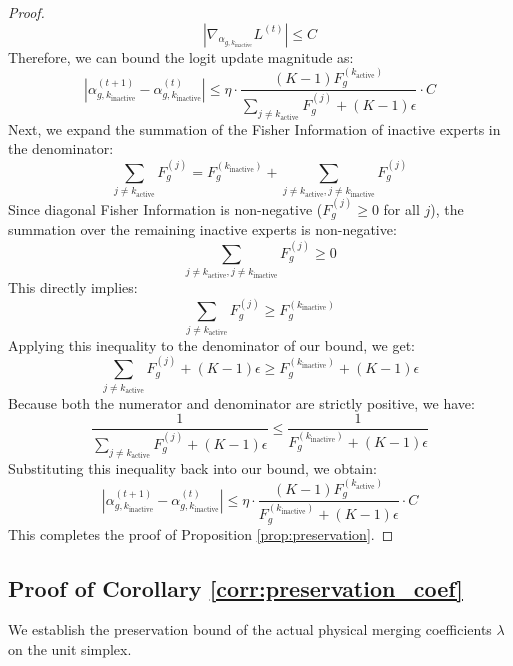 \documentclass{article}
\theoremstyle{plain}
\theoremstyle{definition}
\theoremstyle{remark}
\begin{document}
\begin{proof}
\begin{equation}
    \left| \nabla_{\alpha_{g, k_{\text{inactive}}}} L^{(t)} \right| \leq C
\end{equation}
Therefore, we can bound the logit update magnitude as:
\begin{equation}
    \left| \alpha^{(t+1)}_{g, k_{\text{inactive}}} - \alpha^{(t)}_{g, k_{\text{inactive}}} \right| \leq \eta \cdot \frac{(K-1)F^{(k_{\text{active}})}_g}{\sum_{j \neq k_{\text{active}}} F^{(j)}_g + (K-1)\epsilon} \cdot C
\end{equation}
Next, we expand the summation of the Fisher Information of inactive experts in the denominator:
\begin{equation}
    \sum_{j \neq k_{\text{active}}} F^{(j)}_g = F^{(k_{\text{inactive}})}_g + \sum_{j \neq k_{\text{active}}, j \neq k_{\text{inactive}}} F^{(j)}_g
\end{equation}
Since diagonal Fisher Information is non-negative ($F^{(j)}_g \geq 0$ for all $j$), the summation over the remaining inactive experts is non-negative:
\begin{equation}
    \sum_{j \neq k_{\text{active}}, j \neq k_{\text{inactive}}} F^{(j)}_g \geq 0
\end{equation}
This directly implies:
\begin{equation}
    \sum_{j \neq k_{\text{active}}} F^{(j)}_g \geq F^{(k_{\text{inactive}})}_g
\end{equation}
Applying this inequality to the denominator of our bound, we get:
\begin{equation}
    \sum_{j \neq k_{\text{active}}} F^{(j)}_g + (K-1)\epsilon \geq F^{(k_{\text{inactive}})}_g + (K-1)\epsilon
\end{equation}
Because both the numerator and denominator are strictly positive, we have:
\begin{equation}
    \frac{1}{\sum_{j \neq k_{\text{active}}} F^{(j)}_g + (K-1)\epsilon} \leq \frac{1}{F^{(k_{\text{inactive}})}_g + (K-1)\epsilon}
\end{equation}
Substituting this inequality back into our bound, we obtain:
\begin{equation}
    \left| \alpha^{(t+1)}_{g, k_{\text{inactive}}} - \alpha^{(t)}_{g, k_{\text{inactive}}} \right| \leq \eta \cdot \frac{(K-1)F^{(k_{\text{active}})}_g}{F^{(k_{\text{inactive}})}_g + (K-1)\epsilon} \cdot C
\end{equation}
This completes the proof of Proposition \ref{prop:preservation}.
\end{proof}

\subsection{Proof of Corollary \ref{corr:preservation_coef}}
We establish the preservation bound of the actual physical merging coefficients $\lambda$ on the unit simplex.
\end{document}
